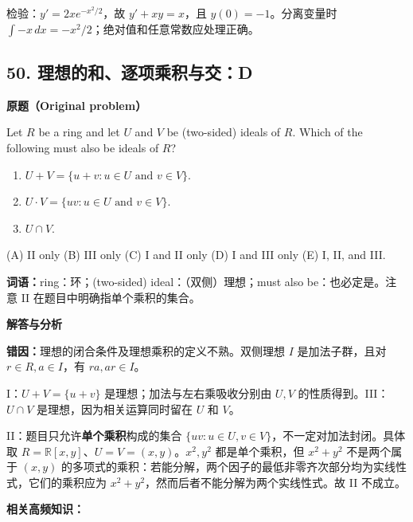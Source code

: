 \documentclass[11pt,a4paper,fontset=fandol]{ctexart}
\begin{document}
检验：\(y'=2xe^{-x^2/2}\)，故 \(y'+xy=x\)，且 \(y(0)=-1\)。分离变量时
\(\int -x\,dx=-x^2/2\)；绝对值和任意常数应处理正确。

\hypertarget{ux7406ux60f3ux7684ux548cux9010ux9879ux4e58ux79efux4e0eux4ea4d}{%
\subsection{50.
理想的和、逐项乘积与交：D}\label{ux7406ux60f3ux7684ux548cux9010ux9879ux4e58ux79efux4e0eux4ea4d}}

\textbf{原题（Original problem）}\par
Let $R$ be a ring and let $U$ and $V$ be (two-sided) ideals of $R$. Which of the following must also be ideals of $R$?
\begin{enumerate}[label=\Roman*.]
\item $U+V=\{u+v:u\in U\text{ and }v\in V\}$.
\item $U\cdot V=\{uv:u\in U\text{ and }v\in V\}$.
\item $U\cap V$.
\end{enumerate}
(A) II only \quad (B) III only \quad (C) I and II only \quad (D) I and III only \quad (E) I, II, and III.

\textbf{词语：}ring：环；(two-sided) ideal：（双侧）理想；must also be：也必定是。注意 II 在题目中明确指单个乘积的集合。

\textbf{解答与分析}\par


\textbf{错因：}理想的闭合条件及理想乘积的定义不熟。双侧理想 \(I\)
是加法子群，且对 \(r\in R,a\in I\)，有 \(ra,ar\in I\)。

I：\(U+V=\{u+v\}\) 是理想；加法与左右乘吸收分别由 \(U,V\)
的性质得到。III：\(U\cap V\) 是理想，因为相关运算同时留在 \(U\) 和
\(V\)。

II：题目只允许\textbf{单个乘积}构成的集合
\(\{uv:u\in U,v\in V\}\)，不一定对加法封闭。具体取
\(R=\mathbb R[x,y]\)、\(U=V=(x,y)\)。\(x^2,y^2\) 都是单个乘积，但
\(x^2+y^2\) 不是两个属于 \((x,y)\)
的多项式的乘积：若能分解，两个因子的最低非零齐次部分均为实线性式，它们的乘积应为
\(x^2+y^2\)，然而后者不能分解为两个实线性式。故 II 不成立。

\textbf{相关高频知识：}
\end{document}
